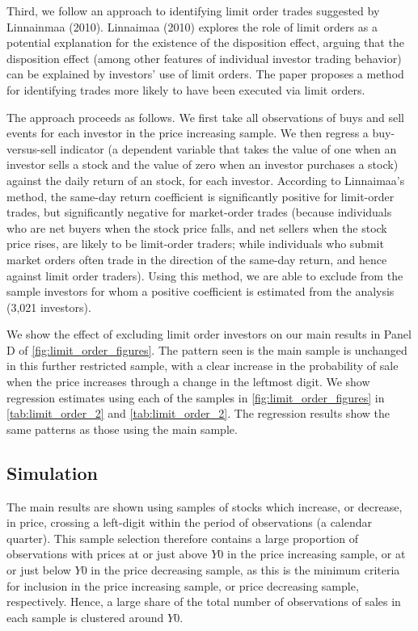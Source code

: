 Third, we follow an approach to identifying limit order trades suggested by  Linnainmaa (2010). Linnaimaa (2010) explores the role of limit orders as a potential explanation for the existence of the disposition effect, arguing that the disposition effect (among other features of individual investor trading behavior) can be explained by investors' use of limit orders. The paper proposes a method for identifying trades more likely to have been executed via limit orders.  

The approach proceeds as follows. We first take all observations of buys and sell events for each investor in the price increasing sample. We then regress a buy-versus-sell indicator (a dependent variable that takes the value of one when an investor sells a stock and the value of zero when an investor purchases a stock) against the daily return of an stock, for each investor. According to Linnaimaa's method, the same-day return coefficient is significantly positive for limit-order trades, but significantly negative for market-order trades (because individuals who are net buyers when the stock price falls, and net sellers when the stock price rises, are likely to be limit-order traders; while individuals who submit market orders often trade in the direction of the same-day return, and hence against limit order traders). Using this method, we are able to exclude from the sample investors for whom a positive coefficient is estimated from the analysis (3,021 investors).

We show the effect of excluding limit order investors on our main results in Panel D of \ref{fig:limit_order_figures}. The pattern seen is the main sample is unchanged in this further restricted sample, with a clear increase in the probability of sale when the price increases through a change in the leftmost digit. We show regression estimates using each of the samples in \ref{fig:limit_order_figures} in \ref{tab:limit_order_2} and  \ref{tab:limit_order_2}. The regression results show the same patterns as those using the main sample.

\subsection{Simulation}

The main results are shown using samples of stocks which increase, or decrease, in price, crossing a left-digit within the period of observations (a calendar quarter). This sample selection therefore contains a large proportion of observations with prices at or just above $Y0$ in the price increasing sample, or at or just below $Y0$ in the price decreasing sample, as this is the minimum criteria for inclusion in the price increasing sample, or price decreasing sample, respectively. Hence, a large share of the total number of observations of sales in each sample is clustered around $Y0$.

